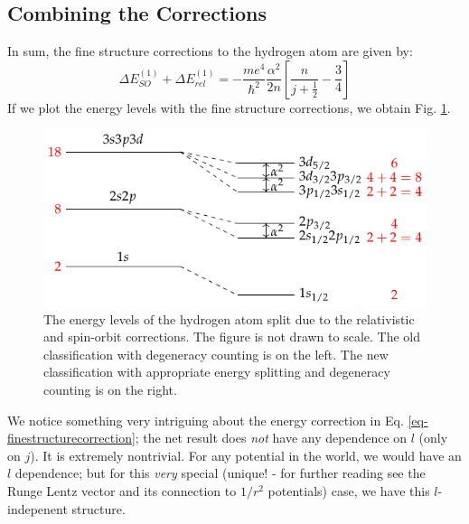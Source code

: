 \subsection{Combining the Corrections}
In sum, the fine structure corrections to the hydrogen atom are given by:
\begin{equation}\label{eq-finestructurecorrection}
    \Delta E_{SO}^{(1)} + \Delta E_{rel}^{(1)} = -\frac{me^4}{\hbar^2}\frac{\alpha^2}{2n}\left[\frac{n}{j+\frac{1}{2}} - \frac{3}{4}\right]
\end{equation}
If we plot the energy levels with the fine structure corrections, we obtain Fig. \ref{fig-finestructuresplit}.

\begin{figure}[htbp]
    \centering
    \includegraphics[]{Images/fig-finestructuresplit.pdf}

    \caption{The energy levels of the hydrogen atom split due to the relativistic and spin-orbit corrections. The figure is not drawn to scale. The old classification with degeneracy counting is on the left. The new classification with appropriate energy splitting and degeneracy counting is on the right.}
    \label{fig-finestructuresplit}
\end{figure}

We notice something very intriguing about the energy correction in Eq. \eqref{eq-finestructurecorrection}; the net result does \emph{not} have any dependence on $l$ (only on $j$). It is extremely nontrivial. For any potential in the world, we would have an $l$ dependence; but for this \emph{very} special (unique! - for further reading see the Runge Lentz vector and its connection to $1/r^2$ potentials) case, we have this $l$-indepenent structure. 